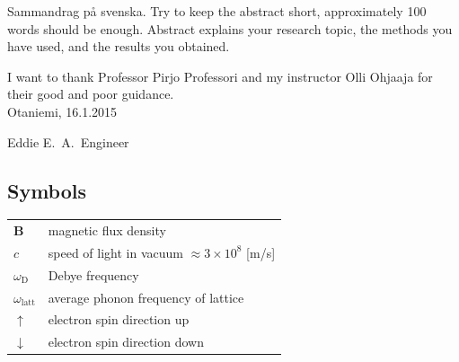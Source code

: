 \documentclass[english,12pt,a4paper,pdftex,sci,utf8]{aaltothesis}
\begin{document}
\newpage
%
%
\begin{abstractpage}[swedish]
 Sammandrag p\aa{} svenska.
 Try to keep the abstract short, approximately 
 100 words should be enough. Abstract explains your research topic, 
 the methods you have used, and the results you obtained.  
\end{abstractpage}

I want to thank Professor Pirjo Professori
and my instructor Olli Ohjaaja for their 
good and poor guidance.\\

\vspace{5cm}
Otaniemi, 16.1.2015

\vspace{5mm}
{\hfill Eddie E.\ A.\ Engineer \hspace{1cm}}

\newpage


\thesistableofcontents



\subsection*{Symbols}

\begin{tabular}{ll}
$\mathbf{B}$  & magnetic flux density  \\
$c$              & speed of light in vacuum $\approx 3\times10^8$ [m/s]\\
$\omega_{\mathrm{D}}$    & Debye frequency \\
$\omega_{\mathrm{latt}}$ & average phonon frequency of lattice \\
$\uparrow$       & electron spin direction up\\
$\downarrow$     & electron spin direction down
\end{tabular}
\end{document}
